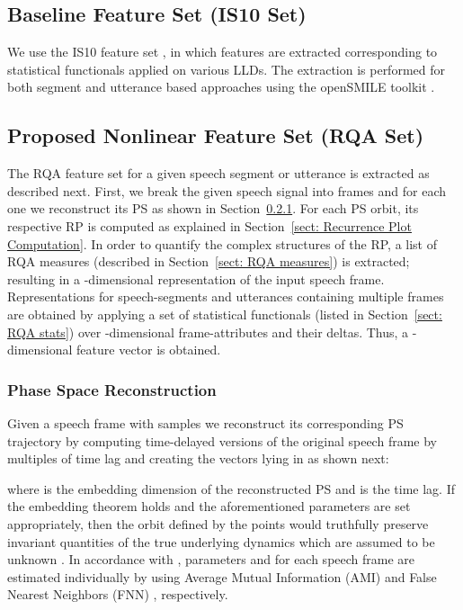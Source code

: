 \documentclass[a4paper]{article}
\begin{document}
\subsection{Baseline Feature Set (IS10 Set)}
\label{sect:IS10featureset}
We use the IS10 feature set \cite{schuller2010interspeech}, in which  features are extracted corresponding to statistical functionals applied on various LLDs. The extraction is performed for both segment and utterance based approaches using the openSMILE toolkit \cite{opensmile}. 

\subsection{Proposed Nonlinear Feature Set (RQA Set)}
\label{sect:RQAFeatureSet}
The RQA feature set for a given speech segment or utterance is extracted as described next. First, we break the given speech signal into frames and for each one we reconstruct its PS as shown in Section~\ref{sect: Phase Space Reconstruction}. For each PS orbit, its respective RP is computed as explained in Section~\ref{sect: Recurrence Plot Computation}. In order to quantify the complex structures of the RP, a list of RQA measures (described in Section~\ref{sect: RQA measures}) is extracted; resulting in a -dimensional representation of the input speech frame. Representations for speech-segments and utterances containing multiple frames are obtained by applying a set of  statistical functionals (listed in Section~\ref{sect: RQA stats}) over  -dimensional frame-attributes and their deltas. Thus, a -dimensional feature vector is obtained.   



\subsubsection{Phase Space Reconstruction}
\label{sect: Phase Space Reconstruction}
Given a speech frame with  samples  we reconstruct its corresponding PS trajectory by computing  time-delayed versions of the original speech frame by multiples of time lag  and creating the vectors lying in  as shown next:    

where  is the embedding dimension of the reconstructed PS and  is the time lag. If the embedding theorem holds and the aforementioned parameters are set appropriately, then the orbit defined by the points  would truthfully preserve invariant quantities of the true underlying dynamics which are assumed to be unknown \cite{TakensTheorem}. In accordance with \cite{pitsikalis2009analysis}, parameters  and  for each speech frame are estimated individually by using Average Mutual Information (AMI) \cite{AMI} and False Nearest Neighbors (FNN) \cite{FalseNearestNeighbors}, respectively.
\end{document}
